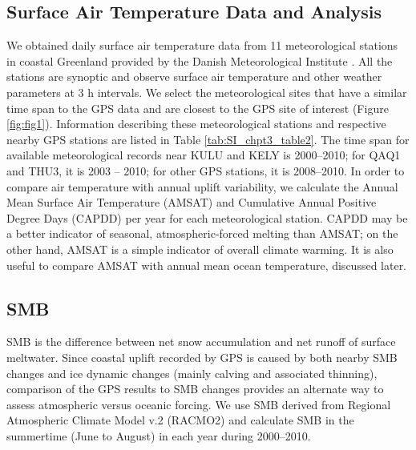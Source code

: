 \subsection{Surface Air Temperature Data and Analysis}
We obtained daily surface air temperature data from 11 meteorological stations in coastal Greenland provided by the Danish Meteorological Institute \cite[]{carstensen2011weather}. All the stations are synoptic and observe surface air temperature and other weather parameters at 3 h intervals. We select the meteorological sites that have a similar time span to the GPS data and are closest to the GPS site of interest (Figure \ref{fig:fig1}). Information describing these meteorological stations and respective nearby GPS stations are listed in Table \ref{tab:SI_chpt3_table2}. The time span for available meteorological records near KULU and KELY is 2000–2010; for QAQ1 and THU3, it is 2003 – 2010; for other GPS stations, it is 2008–2010. In order to compare air temperature with annual uplift variability, we calculate the Annual Mean Surface Air Temperature (AMSAT) and Cumulative Annual Positive Degree Days (CAPDD) per year for each meteorological station. CAPDD may be a better indicator of seasonal, atmospheric-forced melting than AMSAT; on the other hand, AMSAT
is a simple indicator of overall climate warming. It is also useful to compare AMSAT with annual mean ocean temperature, discussed later.

\subsection{SMB}
SMB is the difference between net snow accumulation and net runoff of surface meltwater. Since coastal uplift recorded by GPS is caused by both nearby SMB changes and ice dynamic changes (mainly calving and associated thinning),
comparison of the GPS results to SMB changes provides an alternate way to assess atmospheric versus oceanic forcing. We use SMB derived from Regional Atmospheric Climate Model v.2 (RACMO2) \cite[]{ettema2009higher,ettema2010climateA,ettema2010climateB,kuipers2011new,van2012sensitivity} and calculate SMB in the summertime (June to August) in each year during 2000–2010.

